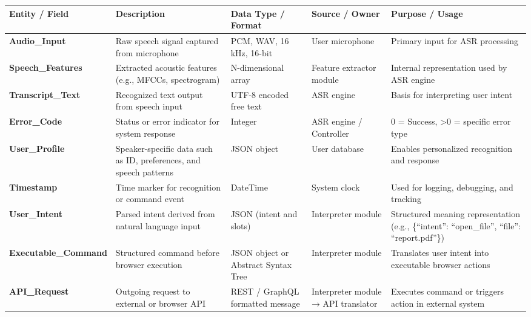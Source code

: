 \documentclass[11pt]{article}
\begin{document}


\begin{tabularx}{\textwidth}{p{3cm} X p{2.8cm} p{2.8cm} X}
\toprule
\textbf{Entity / Field} & \textbf{Description} & \textbf{Data Type / Format} & \textbf{Source / Owner} & \textbf{Purpose / Usage} \\
\midrule

\textbf{Audio\_Input} & Raw speech signal captured from microphone & PCM, WAV, 16 kHz, 16-bit & User microphone & Primary input for ASR processing \\

\textbf{Speech\_Features} & Extracted acoustic features (e.g., MFCCs, spectrogram) & N-dimensional array & Feature extractor module & Internal representation used by ASR engine \\

\textbf{Transcript\_Text} & Recognized text output from speech input & UTF-8 encoded free text & ASR engine & Basis for interpreting user intent \\

\textbf{Error\_Code} & Status or error indicator for system response & Integer & ASR engine / Controller & 0 = Success, >0 = specific error type \\

\textbf{User\_Profile} & Speaker-specific data such as ID, preferences, and speech patterns & JSON object & User database & Enables personalized recognition and response \\

\textbf{Timestamp} & Time marker for recognition or command event & DateTime & System clock & Used for logging, debugging, and tracking \\

\textbf{User\_Intent} & Parsed intent derived from natural language input & JSON (intent and slots) & Interpreter module & Structured meaning representation (e.g., \{“intent”: “open\_file”, “file”: “report.pdf”\}) \\

\textbf{Executable\_Command} & Structured command before browser execution & JSON object or Abstract Syntax Tree & Interpreter module & Translates user intent into executable browser actions \\

\textbf{API\_Request} & Outgoing request to external or browser API & REST / GraphQL formatted message & Interpreter module → API translator & Executes command or triggers action in external system \\


\end{tabularx}
\end{document}
